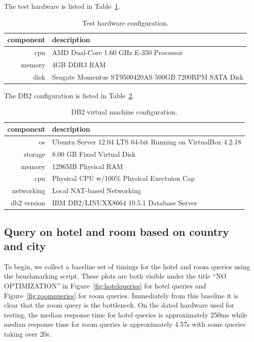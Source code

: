 \documentclass[letterpaper]{article}%
\begin{document}
The test hardware is listed in Table~\ref{tab:testhardware}.

\begin{table}[h]
  \centering
  \small
  \begin{tabular}{rl}
    \toprule
    component & description \\
    \midrule
    cpu & AMD Dual-Core 1.60 GHz E-350 Processor \\
    memory & 4GB DDR3 RAM \\
    disk & Seagate Momentus ST9500420AS 500GB 7200RPM SATA Disk \\
    \bottomrule
  \end{tabular}
  \caption{Test hardware configuration.}
  \label{tab:testhardware}
\end{table}

The DB2 configuration is listed in Table~\ref{tab:db2setup}.

\begin{table}[h]
  \centering
  \small
  \begin{tabular}{rl}
    \toprule
    component & description \\
    \midrule
    os & Ubuntu Server 12.04 LTS 64-bit Running on VirtualBox 4.2.18 \\
    storage & 8.00 GB Fixed Virtual Disk \\
    memory & 1296MB Physical RAM \\
    cpu & Physical CPU w/100\% Physical Exectuion Cap \\
    networking & Local NAT-based Networking \\
    db2 version & IBM DB2/LINUXX8664 10.5.1 Database Server \\
    \bottomrule
  \end{tabular}
  \caption{DB2 virtual machine configuration.}
  \label{tab:db2setup}
\end{table}

\subsection{Query on hotel and room based on country and city}

To begin, we collect a baseline set of timings for the hotel and room queries
using the benchmarking script. These plots are both visible under the title
``NO OPTIMIZATION'' in Figure~\ref{fig:hotelqueries} for hotel queries and
Figure~\ref{fig:roomqueries} for room queries. Immediately from this baseline
it is clear that the room query is the bottleneck. On the dated hardware used
for testing, the median response time for hotel queries is approximately 250ms
while median response time for room queries is approximately 4.57s with some
queries taking over 20s.
\end{document}
